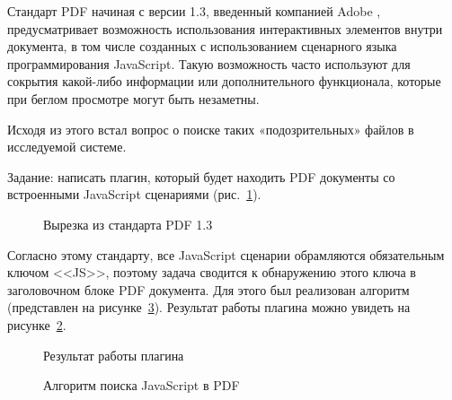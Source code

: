 Стандарт PDF начиная с версии 1.3, введенный компанией Adobe \cite{adobe}, предусматривает возможность использования интерактивных элементов внутри документа, в том числе созданных с использованием сценарного языка программирования JavaScript. Такую возможность часто используют для сокрытия какой-либо информации или дополнительного функционала, которые при беглом просмотре могут быть незаметны. 

Исходя из этого встал вопрос о поиске таких «подозрительных» файлов в исследуемой системе.

Задание: написать плагин, который будет находить PDF документы со встроенными JavaScript сценариями (рис.~\ref{lob_8:lob_8}).

\begin{figure}[h!]
\caption{Вырезка из стандарта PDF 1.3}
\label{lob_8:lob_8}
\end{figure}

Согласно этому стандарту, все JavaScript сценарии обрамляются обязательным ключом <<JS>>, поэтому задача сводится к обнаружению этого ключа в заголовочном блоке PDF документа. Для этого был реализован алгоритм (представлен на рисунке~\ref{lob_9:lob_9}). Результат работы плагина можно увидеть на рисунке~\ref{lob_10:lob_10}.

\begin{figure}[h!]
\caption{Результат работы плагина}
\label{lob_10:lob_10}
\end{figure}

\begin{figure}[h!]
\caption{Алгоритм поиска JavaScript в PDF}
\label{lob_9:lob_9}
\end{figure}

\clearpage
